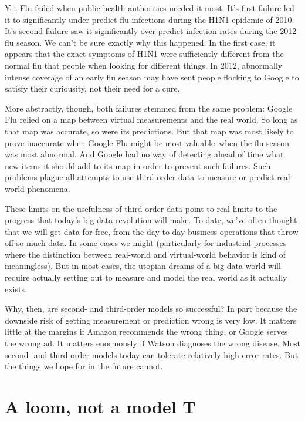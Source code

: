 \documentclass[12pt]{article}
\begin{document}
Yet Flu failed when public health authorities needed it most. It's
first failure led it to significantly under-predict flu infections
during the H1N1 epidemic of 2010. It's second failure saw it
significantly over-predict infection rates during the 2012 flu
season. We can't be sure exactly why this happened. In the first case,
it appears that the exact symptoms of H1N1 were sufficiently different
from the normal flu that people when looking for different things. In
2012, abnormally intense coverage of an early flu season may have sent
people flocking to Google to satisfy their curiousity, not their need
for a cure.

More abstractly, though, both failures stemmed from the same problem:
Google Flu relied on a map between virtual measurements and the real
world. So long as that map was accurate, so were its predictions. But
that map was most likely to prove inaccurate when Google Flu might be
most valuable--when the flu season was most abnormal. And Google had
no way of detecting ahead of time what new items it should add to its
map in order to prevent such failures. Such problems plague all 
attempts to use third-order data to measure or predict real-world
phenomena. 

These limits on the usefulness of third-order data point to real
limits to the progress that today's big data revolution will make. To
date, we've often thought that we will get data for free, from the
day-to-day business operations that throw off so much data. In some
cases we might (particularly for industrial processes where the
distinction between real-world and virtual-world behavior is kind of
meaningless). But in most cases, the utopian dreams of a big data
world will require actually setting out to measure and model the real
world as it actually exists. 

Why, then, are second- and third-order models so successful? In part
because the downside risk of getting measurement or prediction wrong
is very low. It matters little at the margins if Amazon recommends the
wrong thing, or Google serves the wrong ad. It matters enormously if
Watson diagnoses the wrong disease. Most second- and third-order
models today can tolerate relatively high error rates. But the things
we hope for in the future cannot. 


\section{A loom, not a model T}
\label{sec:loom-not-model}
\end{document}
